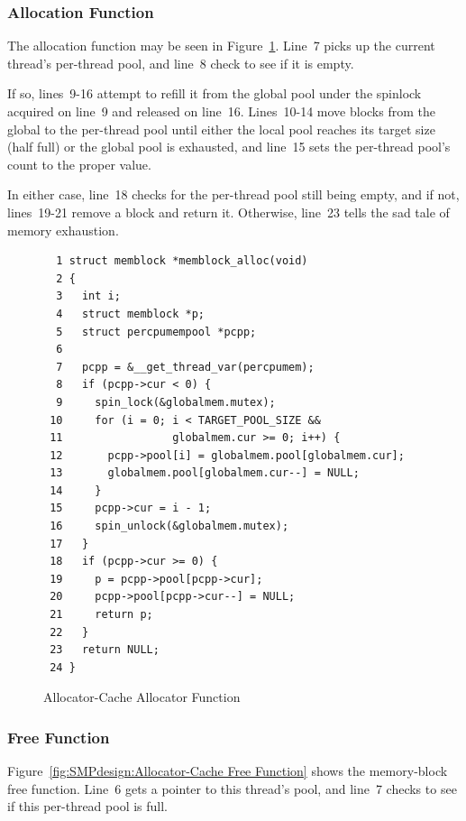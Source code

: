 \subsubsection{Allocation Function}

The allocation function  may be seen in
Figure~\ref{fig:SMPdesign:Allocator-Cache Allocator Function}.
Line~7 picks up the current thread's per-thread pool,
and line~8 check to see if it is empty.

If so, lines~9-16 attempt to refill it from the global pool
under the spinlock acquired on line~9 and released on line~16.
Lines~10-14 move blocks from the global to the per-thread pool until
either the local pool reaches its target size (half full) or
the global pool is exhausted, and line~15 sets the per-thread pool's
count to the proper value.

In either case, line~18 checks for the per-thread pool still being
empty, and if not, lines~19-21 remove a block and return it.
Otherwise, line~23 tells the sad tale of memory exhaustion.

\begin{figure}[htbp]
{ \scriptsize
\begin{verbatim}
  1 struct memblock *memblock_alloc(void)
  2 {
  3   int i;
  4   struct memblock *p;
  5   struct percpumempool *pcpp;
  6
  7   pcpp = &__get_thread_var(percpumem);
  8   if (pcpp->cur < 0) {
  9     spin_lock(&globalmem.mutex);
 10     for (i = 0; i < TARGET_POOL_SIZE &&
 11                 globalmem.cur >= 0; i++) {
 12       pcpp->pool[i] = globalmem.pool[globalmem.cur];
 13       globalmem.pool[globalmem.cur--] = NULL;
 14     }
 15     pcpp->cur = i - 1;
 16     spin_unlock(&globalmem.mutex);
 17   }
 18   if (pcpp->cur >= 0) {
 19     p = pcpp->pool[pcpp->cur];
 20     pcpp->pool[pcpp->cur--] = NULL;
 21     return p;
 22   }
 23   return NULL;
 24 }
\end{verbatim}
}
\caption{Allocator-Cache Allocator Function}
\label{fig:SMPdesign:Allocator-Cache Allocator Function}
\end{figure}

\subsubsection{Free Function}

Figure~\ref{fig:SMPdesign:Allocator-Cache Free Function} shows
the memory-block free function.
Line~6 gets a pointer to this thread's pool, and
line~7 checks to see if this per-thread pool is full.


